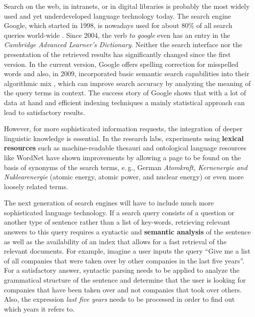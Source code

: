 \documentclass[]{../../metanetpaper}
\begin{document}
\begin{multicols}{2}
Search on the web, in intranets, or in digital libraries is probably the most widely used and yet underdeveloped language technology today. The search engine Google, which started in 1998, is nowadays used for about 80\% of all search queries world-wide \cite{spi1}. Since 2004, the verb \emph{to google} even has an entry in the \emph{Cambridge Advanced Learner’s Dictionary}. Neither the search interface nor the presentation of the retrieved results has significantly changed since the first version. In the current version, Google offers spelling correction for misspelled words and also, in 2009, incorporated basic semantic search capabilities into their algorithmic mix \cite{pc1}, which can improve search accuracy by analyzing the meaning of the query terms in context. The success story of Google shows that with a lot of data at hand and efficient indexing techniques a mainly statistical approach can lead to satisfactory results.  

However, for more sophisticated information requests, the integration of deeper linguistic knowledge is essential. In the research labs, experiments using \textbf{lexical resources} such as machine-readable thesauri and ontological language resources like WordNet have shown improvements by allowing a page to be found on the basis of synonyms of the search terms, e.\,g., German \emph{Atomkraft, Kernenergie and Nuklearenergie} (atomic energy, atomic power, and nuclear energy) or even more loosely related terms. 


The next generation of search engines will have to include much more sophisticated language technology. If a search query consists of a question or another type of sentence rather than a list of key-words, retrieving relevant answers to this query requires a syntactic and \textbf{semantic analysis} of the sentence as well as the availability of an index that allows for a fast retrieval of the relevant documents. For example, imagine a user inputs the query ``Give me a list of all companies that were taken over by other companies in the last five years''. For a satisfactory answer, syntactic parsing needs to be applied to analyze the grammatical structure of the sentence and determine that the user is looking for companies that have been taken over and not companies that took over others. Also, the expression \emph{last five years} needs to be processed in order to find out which years it refers to. 


\end{multicols}
\end{document}
